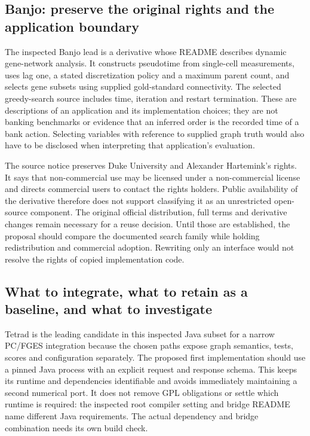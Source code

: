 \hypertarget{banjo-preserve-the-original-rights-and-the-application-boundary}{%
\subsection{Banjo: preserve the original rights and the application
boundary}\label{banjo-preserve-the-original-rights-and-the-application-boundary}}

The inspected Banjo lead is a derivative whose README describes dynamic
gene-network analysis. It constructs pseudotime from single-cell
measurements, uses lag one, a stated discretization policy and a maximum
parent count, and selects gene subsets using supplied gold-standard
connectivity. The selected greedy-search source includes time, iteration
and restart termination. These are descriptions of an application and
its implementation choices; they are not banking benchmarks or evidence
that an inferred order is the recorded time of a bank action. Selecting
variables with reference to supplied graph truth would also have to be
disclosed when interpreting that application's evaluation.
\citep{exec13_java_banjo}

The source notice preserves Duke University and Alexander Hartemink's
rights. It says that non-commercial use may be licensed under a
non-commercial license and directs commercial users to contact the
rights holders. Public availability of the derivative therefore does not
support classifying it as an unrestricted open-source component. The
original official distribution, full terms and derivative changes remain
necessary for a reuse decision. Until those are established, the
proposal should compare the documented search family while holding
redistribution and commercial adoption. Rewriting only an interface
would not resolve the rights of copied implementation code.
\citep{exec13_java_banjo}

\hypertarget{what-to-integrate-what-to-retain-as-a-baseline-and-what-to-investigate}{%
\subsection{What to integrate, what to retain as a baseline, and what to
investigate}\label{what-to-integrate-what-to-retain-as-a-baseline-and-what-to-investigate}}

Tetrad is the leading candidate in this inspected Java subset for a
narrow PC/FGES integration because the chosen paths expose graph
semantics, tests, scores and configuration separately. The proposed
first implementation should use a pinned Java process with an explicit
request and response schema. This keeps its runtime and dependencies
identifiable and avoids immediately maintaining a second numerical port.
It does not remove GPL obligations or settle which runtime is required:
the inspected root compiler setting and bridge README name different
Java requirements. The actual dependency and bridge combination needs
its own build check. \citep{exec13_java_tetrad}


